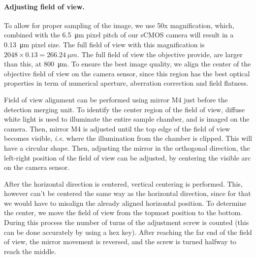     \paragraph{Adjusting field of view.}
      To allow for proper sampling of the image, we use 50x magnification, which, combined with the \SI{6.5}{\micro m} pixel pitch of our sCMOS camera will result in a \SI{0.13}{\micro m} pixel size. The full field of view with this magnification is $2048 \times 0.13 = \SI{266.24}{\micro m}$. The full field of view the objective provide, are larger than this, at \SI{800}{\micro m}. To ensure the best image quality, we align the center of the objective field of view on the camera sensor, since this region has the best optical properties in term of numerical aperture, aberration correction and field flatness.

      Field of view alignment can be performed using mirror M4 just before the detection merging unit. To identify the center region of the field of view, diffuse white light is used to illuminate the entire sample chamber, and is imaged on the camera. Then, mirror M4 is adjusted until the top edge of the field of view becomes visible, \textit{i.e.} where the illumination from the chamber is clipped. This will have a circular shape. Then, adjusting the mirror in the orthogonal direction, the left-right position of the field of view can be adjusted, by centering the visible arc on the camera sensor.

      After the horizontal direction is centered, vertical centering is performed. This, however can't be centered the same way as the horizontal direction, since for that we would have to misalign the already aligned horizontal position. To determine the center, we move the field of view from the topmost position to the bottom. During this process the number of  turns of the adjustment screw is counted (this can be done accurately by using a hex key). After reaching the far end of the field of view, the mirror movement is reversed, and the screw is turned halfway to reach the middle.

    
